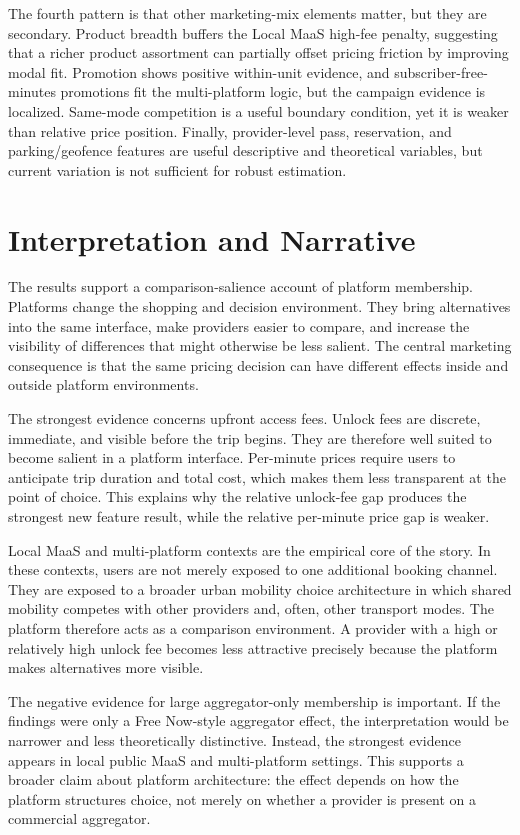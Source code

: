 \documentclass[11pt]{article}
\begin{document}
The fourth pattern is that other marketing-mix elements matter, but they are secondary.
Product breadth buffers the Local MaaS high-fee penalty, suggesting that a richer product
assortment can partially offset pricing friction by improving modal fit. Promotion shows
positive within-unit evidence, and subscriber-free-minutes promotions fit the multi-platform
logic, but the campaign evidence is localized. Same-mode competition is a useful boundary
condition, yet it is weaker than relative price position. Finally, provider-level pass,
reservation, and parking/geofence features are useful descriptive and theoretical variables,
but current variation is not sufficient for robust estimation.

\section{Interpretation and Narrative}

The results support a comparison-salience account of platform membership. Platforms change
the shopping and decision environment. They bring alternatives into the same interface,
make providers easier to compare, and increase the visibility of differences that might
otherwise be less salient. The central marketing consequence is that the same pricing
decision can have different effects inside and outside platform environments.

The strongest evidence concerns upfront access fees. Unlock fees are discrete, immediate,
and visible before the trip begins. They are therefore well suited to become salient in a
platform interface. Per-minute prices require users to anticipate trip duration and total
cost, which makes them less transparent at the point of choice. This explains why the
relative unlock-fee gap produces the strongest new feature result, while the relative
per-minute price gap is weaker.

Local MaaS and multi-platform contexts are the empirical core of the story. In these
contexts, users are not merely exposed to one additional booking channel. They are exposed
to a broader urban mobility choice architecture in which shared mobility competes with
other providers and, often, other transport modes. The platform therefore acts as a
comparison environment. A provider with a high or relatively high unlock fee becomes less
attractive precisely because the platform makes alternatives more visible.

The negative evidence for large aggregator-only membership is important. If the findings
were only a Free Now-style aggregator effect, the interpretation would be narrower and
less theoretically distinctive. Instead, the strongest evidence appears in local public
MaaS and multi-platform settings. This supports a broader claim about platform architecture:
the effect depends on how the platform structures choice, not merely on whether a provider
is present on a commercial aggregator.
\end{document}
